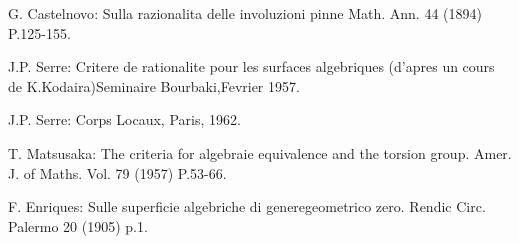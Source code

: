 \begin{thebibliography}{99}
 {G. Castelnovo}: {Sulla razionalita delle involuzioni pinne
  Math. Ann. 44 (1894)  P.125-155.} 

 {J.P. Serre}: {Critere de rationalite pour les surfaces
  algebriques (d'apres un cours de K.Kodaira)Seminaire
  Bourbaki,Fevrier 1957.} 

 {J.P. Serre}: {Corps Locaux, Paris, 1962.} 

 {T. Matsusaka}: {The criteria for algebraie equivalence and
  the torsion group. Amer. J. of Maths. Vol. 79 (1957) P.53-66.} 

 {F. Enriques}: {Sulle superficie algebriche di
  generegeometrico zero. Rendic Circ. Palermo 20  (1905) p.1.} 
\end{thebibliography}

